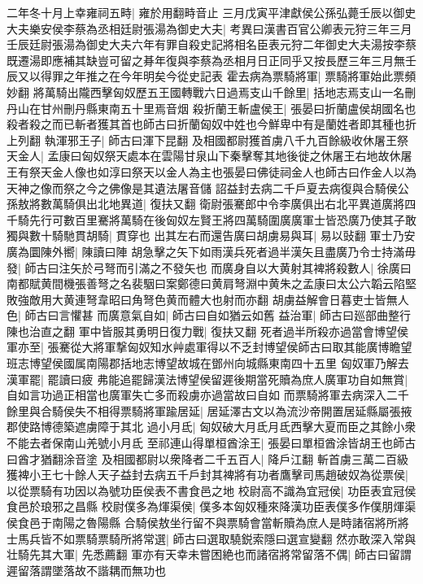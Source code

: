 二年冬十月上幸雍祠五畤|{
	雍於用翻畤音止}
三月戊寅平津獻侯公孫弘薨壬辰以御史大夫樂安侯李蔡為丞相廷尉張湯為御史大夫|{
	考異曰漢書百官公卿表元狩三年三月壬辰廷尉張湯為御史大夫六年有罪自殺史記將相名臣表元狩二年御史大夫湯按李蔡既遷湯即應補其缺豈可留之朞年復與李蔡為丞相月日正同乎又按長歷三年三月無壬辰又以得罪之年推之在今年明矣今從史記表}
霍去病為票騎將軍|{
	票騎將軍始此票頻妙翻}
將萬騎出隴西擊匈奴歷五王國轉戰六日過焉支山千餘里|{
	括地志焉支山一名刪丹山在甘州刪丹縣東南五十里焉音烟}
殺折蘭王斬盧侯王|{
	張晏曰折蘭盧侯胡國名也殺者殺之而已斬者獲其首也師古曰折蘭匈奴中姓也今鮮卑中有是蘭姓者即其種也折上列翻}
執渾邪王子|{
	師古曰渾下昆翻}
及相國都尉獲首虜八千九百餘級收休屠王祭天金人|{
	孟康曰匈奴祭天處本在雲陽甘泉山下秦擊奪其地後徙之休屠王右地故休屠王有祭天金人像也如淳曰祭天以金人為主也張晏曰佛徒祠金人也師古曰作金人以為天神之像而祭之今之佛像是其遺法屠音儲}
詔益封去病二千戶夏去病復與合騎侯公孫敖將數萬騎俱出北地異道|{
	復扶又翻}
衛尉張騫郎中令李廣俱出右北平異道廣將四千騎先行可數百里騫將萬騎在後匈奴左賢王將四萬騎圍廣廣軍士皆恐廣乃使其子敢獨與數十騎馳貫胡騎|{
	貫穿也}
出其左右而還告廣曰胡虜易與耳|{
	易以䜴翻}
軍士乃安廣為圜陳外嚮|{
	陳讀曰陣}
胡急擊之矢下如雨漢兵死者過半漢矢且盡廣乃令士持滿毋發|{
	師古曰注矢於弓弩而引滿之不發矢也}
而廣身自以大黄射其裨將殺數人|{
	徐廣曰南都賦黄間機張善弩之名裴駰曰案鄭德曰黄肩弩淵中黄朱之孟康曰太公六韜云陷堅敗強敵用大黄連弩韋昭曰角弩色黄而體大也射而亦翻}
胡虜益解會日暮吏士皆無人色|{
	師古曰言懼甚}
而廣意氣自如|{
	師古曰自如猶云如舊}
益治軍|{
	師古曰廵部曲整行陳也治直之翻}
軍中皆服其勇明日復力戰|{
	復扶又翻}
死者過半所殺亦過當會博望侯軍亦至|{
	張騫從大將軍撃匈奴知水艸處軍得以不乏封博望侯師古曰取其能廣博瞻望班志博望侯國属南陽郡括地志博望故城在鄧州向城縣東南四十五里}
匈奴軍乃解去漢軍罷|{
	罷讀曰疲}
弗能追罷歸漢法博望侯留遲後期當死贖為庶人廣軍功自如無賞|{
	自如言功過正相當也廣軍失亡多而殺虜亦過當故曰自如}
而票騎將軍去病深入二千餘里與合騎侯失不相得票騎將軍踰居延|{
	居延澤古文以為流沙帝開置居延縣屬張掖郡使路博德築遮虜障于其北}
過小月氐|{
	匈奴破大月氐月氐西擊大夏而臣之其餘小衆不能去者保南山羌號小月氐}
至祁連山得單桓酋涂王|{
	張晏曰單桓酋涂皆胡王也師古曰酋才猶翻涂音塗}
及相國都尉以衆降者二千五百人|{
	降戶江翻}
斬首虜三萬二百級獲裨小王七十餘人天子益封去病五千戶封其裨將有功者鷹擊司馬趙破奴為從票侯|{
	以從票騎有功因以為號功臣侯表不書食邑之地}
校尉高不識為宜冠侯|{
	功臣表宜冠侯食邑於琅邪之昌縣}
校尉僕多為煇渠侯|{
	僕多本匈奴種來降漢功臣表僕多作僕朋煇渠侯食邑于南陽之魯陽縣}
合騎侯敖坐行留不與票騎會當斬贖為庶人是時諸宿將所將士馬兵皆不如票騎票騎所將常選|{
	師古曰選取驍鋭索隱曰選宣變翻}
然亦敢深入常與壮騎先其大軍|{
	先悉薦翻}
軍亦有天幸未嘗困絶也而諸宿將常留落不偶|{
	師古曰留謂遲留落謂墜落故不諧耦而無功也}

